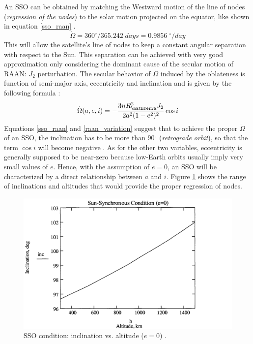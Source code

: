 An SSO can be obtained by matching the Westward motion of the line of nodes (\textit{regression of the nodes}) to the solar motion projected on the equator, like shown in equation \ref{sso_raan} \cite{brown1998spacecraft}.
\begin{equation} \label{sso_raan}
    \dot{\Omega} = 360^{\circ} / 365.242\;days = 0.9856\;^{\circ}/day 
\end{equation}
This will allow the satellite's line of nodes to keep a constant angular separation with respect to the Sun.
This separation can be achieved with very good approximation only considering the dominant cause of the secular motion of RAAN: $J_2$ perturbation.  
The secular behavior of $\Omega$ induced by the oblateness is function of semi-major axis, eccentricity and inclination and is given by the following formula \cite{vallado2013fundamentals}:
\begin{equation} \label{raan_variation}
    \dot{\Omega}(a,e,i) = - \frac{3n R_{\mathTerra}^2 J_2}{2a^2 (1-e^2)^2} \cos{i}
\end{equation}
Equations \ref{sso_raan} and \ref{raan_variation} suggest that to achieve the proper $\dot{\Omega}$ of an SSO, the inclination has to be more than 90$^\circ$ (\textit{retrograde orbit}), so that the term $\cos{i}$ will become negative \cite{wertz2009orbit}.
As for the other two variables, eccentricity is generally supposed to be near-zero because low-Earth orbits usually imply very small values of $e$.
Hence, with the assumption of $e=0$, an SSO will be characterized by a direct relationship between $a$ and $i$.
Figure \ref{inc_h_sso} shows the range of inclinations and altitudes that would provide the proper regression of nodes.
\begin{figure} 
    \begin{center} 
        \includegraphics[scale=0.5]{img/inc_vs_h_sso.png}
    \end{center}
        \caption{SSO condition: inclination vs. altitude ($e=0$) \cite{brown1998spacecraft}.}
        \label{inc_h_sso}
\end{figure}


